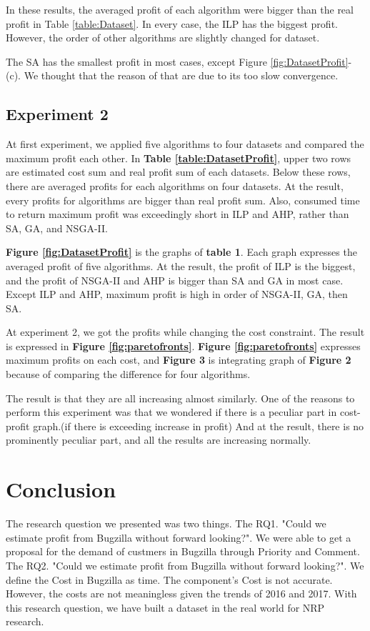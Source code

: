 In these results, the averaged profit of each algorithm were bigger than the real profit in Table \ref{table:Dataset}. In every case, the ILP has the biggest profit. However, the order of other algorithms are slightly changed for dataset.

The SA has the smallest profit in most cases, except Figure \ref{fig:DatasetProfit}-(c). We thought that the reason of that are due to its too slow convergence.

\subsection{Experiment 2}



At first experiment, we applied five algorithms to four datasets and compared the maximum profit each other. In \textbf{Table \ref{table:DatasetProfit}}, upper two rows are estimated cost sum and real profit sum of each datasets. Below these rows, there are averaged profits for each algorithms on four datasets. At the result, every profits for algorithms are bigger than real profit sum. Also, consumed time to return maximum profit was exceedingly short in ILP and AHP, rather than SA, GA, and NSGA-II.

\textbf{Figure \ref{fig:DatasetProfit}} is the graphs of \textbf{table 1}. Each graph expresses the averaged profit of five algorithms. At the result, the profit of ILP is the biggest, and the profit of NSGA-II and AHP is bigger than SA and GA in most case. Except ILP and AHP, maximum profit is high in order of NSGA-II, GA, then SA.

At experiment 2, we got the profits while changing the cost constraint. The result is expressed in \textbf{Figure \ref{fig:paretofronts}}. \textbf{Figure \ref{fig:paretofronts}} expresses maximum profits on each cost, and \textbf{Figure 3} is integrating graph of \textbf{Figure 2} because of comparing the difference for four algorithms.

The result is that they are all increasing almost similarly. One of the reasons to perform this experiment was that we wondered if there is a peculiar part in cost-profit graph.(if there is exceeding increase in profit) And at the result, there is no prominently peculiar part, and all the results are increasing normally.


\section{Conclusion}
The research question we presented was two things.
The RQ1. "Could we estimate profit from Bugzilla without forward looking?". We were able to get a proposal for the demand of custmers in Bugzilla through Priority and Comment. The RQ2. "Could we estimate profit from Bugzilla without forward looking?". We define the Cost in Bugzilla as time. The component's Cost is not accurate. However, the costs are not meaningless given the trends of 2016 and 2017. With this research question, we have built a dataset in the real world for NRP research.

